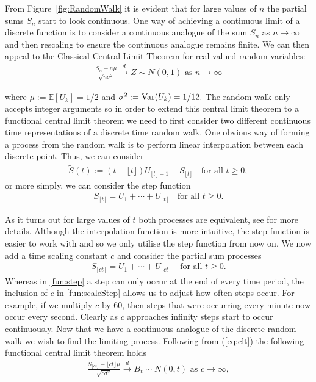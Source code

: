 \documentclass[honours,12pt]{unswthesis}
\newcommand{\E}{\mathbb{E}}
\newcommand{\1}{\mathbf 1}
\newcommand{\Var}{\mathop{\rm Var}}
\numberwithin{equation}{section}
\theoremstyle{definition}
\theoremstyle{remark}
\begin{document}
\noindent From Figure~\ref{fig:RandomWalk} it is evident that for large values of $n$ the partial sums $S_n$ start to look continuous. One way of achieving a continuous limit of a discrete function is to consider a continuous analogue of the sum $S_n$ as $n\to\infty$ and then rescaling to ensure the continuous analogue remains finite. We can then appeal to the Classical Central Limit Theorem for real-valued random variables: %
\begin{align}\label{eq:clt}
\frac{S_n-n\mu}{\sqrt{n\sigma^2}}\overset{d}{\longrightarrow}Z\sim N(0,1)\textrm{ as $n\to\infty$}
\end{align}

\noindent where $\mu:=\E[U_k]=1/2$ and $\sigma^2:=\Var(U_k)=1/12.$
The random walk only accepts integer arguments so in order to extend this central limit theorem to a functional central limit theorem we need to first consider two different continuous time representations of a discrete time random walk. One obvious way of forming a process from the random walk is to perform linear interpolation between each discrete point. Thus, we can consider
\begin{align}
	\tilde{S}(t):=(t-\lfloor t \rfloor)U_{\lfloor t \rfloor +1} + S_{\lfloor t \rfloor}\quad\textrm{for all } t\geq0,
\end{align}
or more simply, we can consider the step function
\begin{align}\label{fun:step}
	S_{\lfloor t \rfloor}=U_1+\cdots+U_{\lfloor t \rfloor}  \quad\textrm{for all } t\geq0.
\end{align}


\noindent As it turns out for large values of $t$ both processes are equivalent, see \cite{Whitt2010} for more details. Although the interpolation function is more intuitive, the step function is easier to work with and so we only utilise the step function from now on. We now add a time scaling constant $c$ and consider the partial sum processes
\begin{align}\label{fun:scaleStep}
	S_{\lfloor ct \rfloor}=U_1+\cdots+U_{\lfloor ct \rfloor}  \quad\textrm{for all } t\geq0.
\end{align}
Whereas in \ref{fun:step} a step can only occur at the end of every time period, the inclusion of $c$ in \ref{fun:scaleStep} allows us to adjust how often steps occur. For example, if we multiply $c$ by 60, then steps that were occurring every minute now occur every second. Clearly as $c$ approaches infinity steps start to occur continuously. Now that we have a continuous analogue of the discrete random walk we wish to find the limiting process. Following from (\ref{eq:clt}) the following functional central limit theorem holds
\begin{align}\label{eq:BMconv}
	\frac{S_{\lfloor ct\rfloor}-\lfloor ct \rfloor \mu}{\sqrt{c\sigma^2}}\overset{d}{\longrightarrow}B_t\sim N(0,t)\textrm{ as $c\to\infty$},
\end{align}
\end{document}
